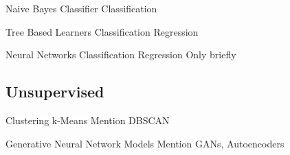   \begin{frame}{Naive Bayes Classifier}
  Classification
  \end{frame}

  \begin{frame}{Tree Based Learners}
  Classification
  Regression
  \end{frame}

  \begin{frame}{Neural Networks}
  Classification
  Regression
  Only briefly
  \end{frame}

  \subsection{Unsupervised}

  \begin{frame}{Clustering}
  k-Means
  Mention DBSCAN
  \end{frame}

  \begin{frame}{Generative Neural Network Models}
  Mention GANs, Autoencoders
  \end{frame}




